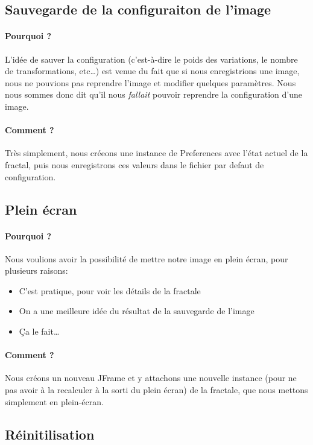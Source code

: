 \documentclass[a4paper]{report}
\begin{document}
\subsection*{Sauvegarde de la configuraiton de l'image}
\paragraph{Pourquoi ?}
L'idée de sauver la configuration (c'est-à-dire le poids des variations, le nombre de transformations, etc\ldots) est venue du fait que si nous enregistrions une image, nous ne pouvions pas reprendre l'image et modifier quelques paramètres. Nous nous sommes donc dit qu'il nous \textit{fallait} pouvoir reprendre la configuration d'une image.

\paragraph{Comment ?}
Très simplement, nous créeons une instance de Preferences avec l'état actuel de la fractal, puis nous enregistrons ces valeurs dans le fichier par defaut de configuration.

\subsection*{Plein écran}
\paragraph{Pourquoi ?}
Nous voulions avoir la possibilité de mettre notre image en plein écran, pour plusieurs raisons:
\begin{itemize}
\item C'est pratique, pour voir les détails de la fractale
\item On a une meilleure idée du résultat de la sauvegarde de l'image
\item Ça le fait\ldots
\end{itemize}

\paragraph{Comment ?}
Nous créons un nouveau JFrame et y attachons une nouvelle instance (pour ne pas avoir à la recalculer à la sorti du plein écran) de la fractale, que nous mettons simplement en plein-écran.

\subsection*{Réinitilisation}
\end{document}
